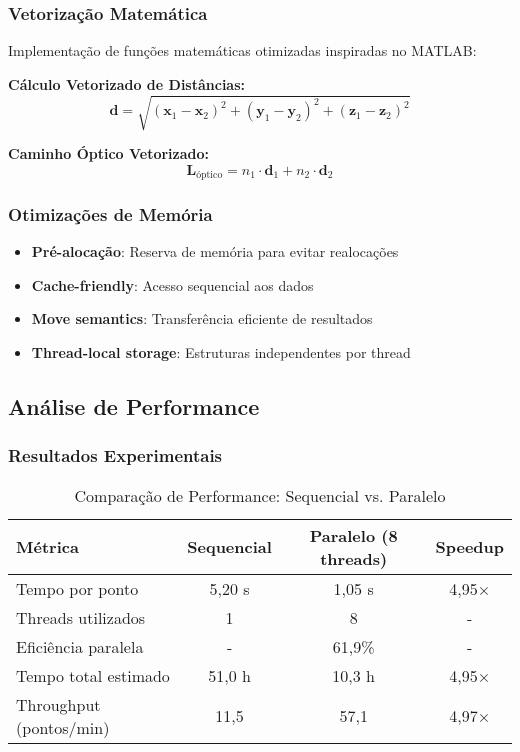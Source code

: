 \documentclass[12pt,a4paper]{article}
\begin{document}
\subsubsection{Vetorização Matemática}

Implementação de funções matemáticas otimizadas inspiradas no MATLAB:

\textbf{Cálculo Vetorizado de Distâncias:}
\begin{equation}
\mathbf{d} = \sqrt{(\mathbf{x}_1 - \mathbf{x}_2)^2 + (\mathbf{y}_1 - \mathbf{y}_2)^2 + (\mathbf{z}_1 - \mathbf{z}_2)^2}
\end{equation}

\textbf{Caminho Óptico Vetorizado:}
\begin{equation}
\mathbf{L}_{\text{óptico}} = n_1 \cdot \mathbf{d}_1 + n_2 \cdot \mathbf{d}_2
\end{equation}

\subsubsection{Otimizações de Memória}

\begin{itemize}
    \item \textbf{Pré-alocação}: Reserva de memória para evitar realocações
    \item \textbf{Cache-friendly}: Acesso sequencial aos dados
    \item \textbf{Move semantics}: Transferência eficiente de resultados
    \item \textbf{Thread-local storage}: Estruturas independentes por thread
\end{itemize}

\subsection{Análise de Performance}

\subsubsection{Resultados Experimentais}

\begin{table}[H]
\centering
\caption{Comparação de Performance: Sequencial vs. Paralelo}
\begin{tabular}{@{}lccc@{}}
\toprule
\textbf{Métrica} & \textbf{Sequencial} & \textbf{Paralelo (8 threads)} & \textbf{Speedup} \\
\midrule
Tempo por ponto & 5,20 s & 1,05 s & 4,95× \\
Threads utilizados & 1 & 8 & - \\
Eficiência paralela & - & 61,9\% & - \\
Tempo total estimado & 51,0 h & 10,3 h & 4,95× \\
Throughput (pontos/min) & 11,5 & 57,1 & 4,97× \\
\bottomrule
\end{tabular}
\end{table}
\end{document}
